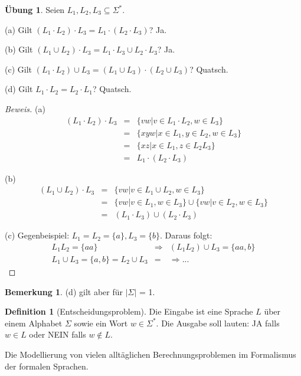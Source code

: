 \documentclass[11pt]{article} %
\theoremstyle{definition}
\newtheorem{definition}{Definition}
\newtheorem*{bemerkung}{Bemerkung}
\newtheorem*{ubung}{Übung}
\begin{document}
\begin{ubung}
Seien $L_1, L_2, L_3 \subseteq \Sigma^*$. 

(a) Gilt $(L_1\cdot L_2)\cdot L_3 =L_1\cdot(L_2\cdot L_3 )$? Ja.

(b) Gilt $(L_1\cup L_2)\cdot L_3 = L_1\cdot L_3 \cup L_2 \cdot L_3$? Ja.

(c) Gilt $(L_1\cdot L_2)\cup L_3 = (L_1\cup L_3) \cdot (L_2\cup L_3)$? Quatsch.

(d) Gilt $L_1\cdot L_2 = L_2\cdot L_1$? Quatsch.

\end{ubung}

\begin{proof}[Beweis]
(a)
\begin{eqnarray*}
(L_1\cdot L_2) \cdot L_3 &=& \{ vw | v \in L_1\cdot L_2, w \in L_3 \} \\
&=&\{xyw | x\in L_1, y \in L_2, w \in L_3 \} \\
&=& \{xz | x \in L_1, z \in L_2 L_3 \} \\
&=& L_1\cdot (L_2\cdot L_3)
\end{eqnarray*}

(b)
\begin{eqnarray*}
(L_1 \cup L_2) \cdot L_3 &=& \{vw | v \in L_1 \cup L_2, w \in L_3 \} \\
&=& \{vw | v \in L_1, w \in L_3 \} \cup \{ vw | v \in L_2, w \in L_3 \} \\
&=& (L_1\cdot L_3) \cup (L_2 \cdot L_3)
\end{eqnarray*}

(c)
Gegenbeispiel: $L_1 = L_2 = \{a\}, L_3 = \{b \}$. Daraus folgt:
\begin{eqnarray*}
L_1 L_2 = \{aa\} &\Rightarrow& (L_1 L_2)\cup L_3 = \{aa,b \} \\
L_1 \cup L_3 = \{a,b\} = L_2 \cup L_3 &=& \Rightarrow ...
\end{eqnarray*}

\end{proof}

\begin{bemerkung}
(d) gilt aber für $|\Sigma|$ = 1.
\end{bemerkung}

\begin{definition}[Entscheidungsproblem]
Die Eingabe ist eine Sprache $L$ über einem Alphabet $\Sigma$ sowie ein Wort $w \in \Sigma^*$. Die Ausgabe soll lauten: JA falls $w \in L$ oder NEIN falls $w \notin L$.

Die Modellierung von vielen alltäglichen Berechnungsproblemen im Formalismus der formalen Sprachen.
\end{definition}
\end{document}
